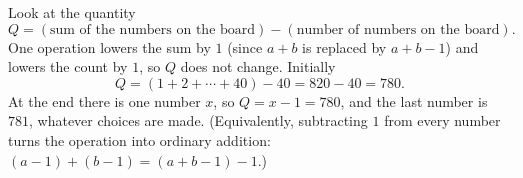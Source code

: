 Look at the quantity
\[
Q=(\text{sum of the numbers on the board})-(\text{number of numbers on the board}).
\]
One operation lowers the sum by $1$ (since $a+b$ is replaced by $a+b-1$) and lowers the count by $1$, so $Q$ does not change. Initially
\[
Q=(1+2+\cdots+40)-40=820-40=780 .
\]
At the end there is one number $x$, so $Q=x-1=780$, and the last number is $\boxed{781}$, whatever choices are made. (Equivalently, subtracting $1$ from every number turns the operation into ordinary addition: $(a-1)+(b-1)=(a+b-1)-1$.)
